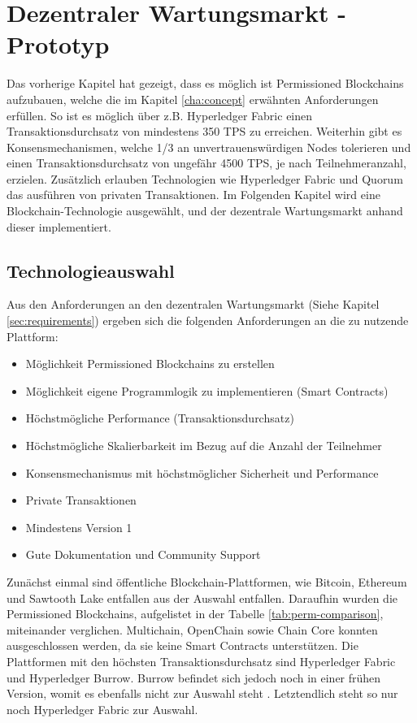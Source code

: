 \chapter{Dezentraler Wartungsmarkt - Prototyp}
\label{cha:wartungsmarkt-impl}

Das vorherige Kapitel hat gezeigt, dass es möglich ist Permissioned Blockchains aufzubauen, welche die im Kapitel \ref{cha:concept} erwähnten Anforderungen erfüllen. So ist es möglich über z.B. Hyperledger Fabric einen Transaktionsdurchsatz von mindestens 350 TPS zu erreichen. Weiterhin gibt es Konsensmechanismen, welche 1/3 an unvertrauenswürdigen Nodes tolerieren und einen Transaktionsdurchsatz von ungefähr 4500 TPS, je nach Teilnehmeranzahl, erzielen. Zusätzlich erlauben Technologien wie Hyperledger Fabric und Quorum das ausführen von privaten Transaktionen. Im Folgenden Kapitel wird eine Blockchain-Technologie ausgewählt, und der dezentrale Wartungsmarkt anhand dieser implementiert.  

\section{Technologieauswahl}
Aus den Anforderungen an den dezentralen Wartungsmarkt (Siehe Kapitel \ref{sec:requirements}) ergeben sich die folgenden Anforderungen an die zu nutzende Plattform: 

\begin{itemize}
    \item Möglichkeit Permissioned Blockchains zu erstellen
    \item Möglichkeit eigene Programmlogik zu implementieren (Smart Contracts)
    \item Höchstmögliche Performance (Transaktionsdurchsatz)
    \item Höchstmögliche Skalierbarkeit im Bezug auf die Anzahl der Teilnehmer
    \item Konsensmechanismus mit höchstmöglicher Sicherheit und Performance
    \item Private Transaktionen   
    \item Mindestens Version 1
    \item Gute Dokumentation und Community Support
\end{itemize}

Zunächst einmal sind öffentliche Blockchain-Plattformen, wie Bitcoin, Ethereum und Sawtooth Lake entfallen aus der Auswahl entfallen. Daraufhin wurden die Permissioned Blockchains, aufgelistet in der Tabelle \ref{tab:perm-comparison}, miteinander verglichen. Multichain, OpenChain sowie Chain Core konnten ausgeschlossen werden, da sie keine Smart Contracts unterstützen. Die Plattformen mit den höchsten Transaktionsdurchsatz sind Hyperledger Fabric und Hyperledger Burrow. Burrow befindet sich jedoch noch in einer frühen Version, womit es ebenfalls nicht zur Auswahl steht \cite{GitHubReleasesHyperledger2018}. Letztendlich steht so nur noch Hyperledger Fabric zur Auswahl. 

